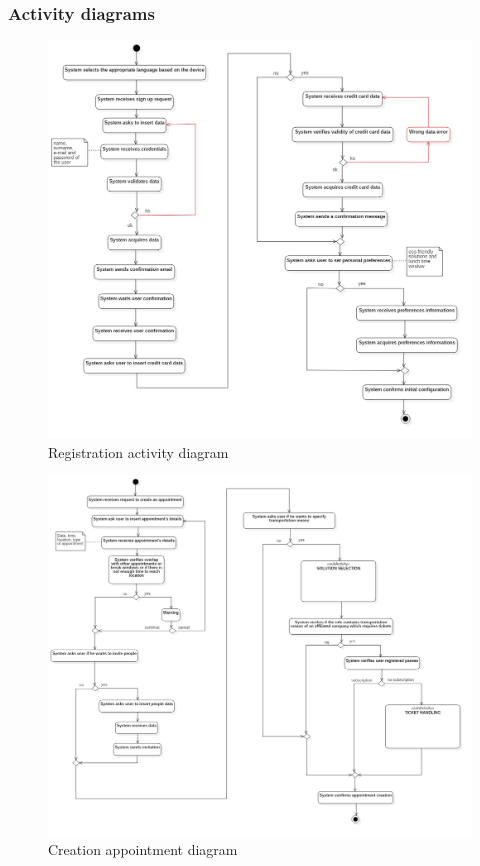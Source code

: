 	\subsubsection{Activity diagrams}
		\begin{figure}[H]
			\centerline{\includegraphics[width=\paperwidth-1]{Images/RegistrationDiagramAD}}
			\caption{Registration activity diagram}
		\end{figure}
		\begin{figure}[H]
			\centerline{\includegraphics[width=\paperwidth-1]{Images/CreationAppointmentAD}}
			\caption{Creation appointment diagram}
		\end{figure}
